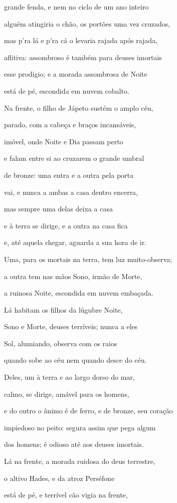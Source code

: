 \begin{pages}
\begin{Rightside}
grande fenda, e nem no ciclo de um ano inteiro 

alguém atingiria o chão, os portões uma vez cruzados,

mas p'ra lá e p'ra cá o levaria rajada após rajada,

aflitiva: assombroso é também para deuses imortais

esse prodígio; e a morada assombrosa de Noite

está de pé, escondida em nuvem cobalto. 

\quad{}Na frente, o filho de Jápeto sustém o amplo céu,

parado, com a cabeça e braços incansáveis,

imóvel, onde Noite e Dia passam perto

e falam entre si ao cruzarem o grande umbral

de bronze: uma entra e a outra pela porta 

vai, e nunca a ambas a casa dentro encerra,

mas sempre uma delas deixa a casa

e à terra se dirige, e a outra na casa fica

e, até aquela chegar, aguarda a sua hora de ir.

Uma, para os mortais na terra, tem luz muito-observa; 

a outra tem nas mãos Sono, irmão de Morte,

a ruinosa Noite, escondida em nuvem embaçada.

\quad{}Lá habitam os filhos da lúgubre Noite,

Sono e Morte, deuses terríveis; nunca a eles

Sol, alumiando, observa com os raios 

quando sobe ao céu nem quando desce do céu.

Deles, um à terra e ao largo dorso do mar,

calmo, se dirige, amável para os homens,

e do outro o ânimo é de ferro, e de bronze, seu coração

impiedoso no peito: segura assim que pega algum 

dos homens; é odioso até aos deuses imortais.

\quad{}Lá na frente, a morada ruidosa do deus terrestre,

o altivo Hades, e da atroz Perséfone

está de pé, e terrível cão vigia na frente,


\end{Rightside}
\end{pages}
